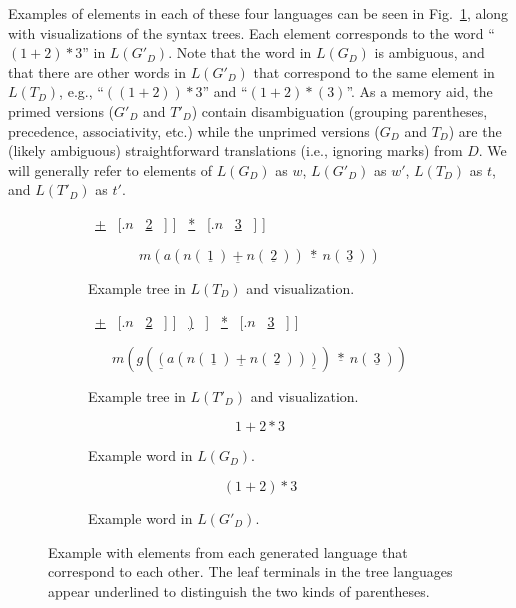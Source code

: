 \documentclass[acmsmall,review,anonymous]{acmart}\settopmatter{printfolios=true,printccs=false,printacmref=false}
\begin{document}
Examples of elements in each of these four languages can be seen in Fig.~\ref{fig:example-words-in-square}, along with visualizations of the syntax trees. Each element corresponds to the word ``$(1 + 2) * 3$'' in $L(G'_D)$. Note that the word in $L(G_D)$ is ambiguous, and that there are other words in $L(G'_D)$ that correspond to the same element in $L(T_D)$, e.g., ``$((1 + 2)) * 3$'' and ``$(1 + 2) * (3)$''. As a memory aid, the primed versions ($G'_D$ and $T'_D$) contain disambiguation (grouping parentheses, precedence, associativity, etc.) while the unprimed versions ($G_D$ and $T_D$) are the (likely ambiguous) straightforward translations (i.e., ignoring marks) from $D$. We will generally refer to elements of $L(G_D)$ as $w$, $L(G'_D)$ as $w'$, $L(T_D)$ as $t$, and $L(T'_D)$ as $t'$.

{
\newcommand{\terminal}[1]{\ \underline{#1}\ }

\begin{figure}
  \begin{subfigure}[b]{.45\linewidth}
    \begin{center}
    \Tree [.{$m$}
        [.{$a$}
          [.{$n$} \terminal{1} ]
          \terminal{+}
          [.{$n$} \terminal{2} ] ]
        \terminal{*}
        [.{$n$} \terminal{3} ] ]
    \end{center}
    \[m(a(n(\terminal{1}) \terminal{+} n(\terminal{2})) \terminal{*} n(\terminal{3}))\]
    \caption{Example tree in $L(T_D)$ and visualization.}
  \end{subfigure}
  \begin{subfigure}[b]{.45\linewidth}
    \begin{center}
    \Tree [.{$m$}
        [.{$g$}
          \terminal{(}
          [.{$a$}
            [.{$n$} \terminal{1} ]
            \terminal{+}
            [.{$n$} \terminal{2} ] ]
          \terminal{)} ]
        \terminal{*}
        [.{$n$} \terminal{3} ] ]
    \end{center}
    \[m(g( \terminal{(} a(n( \terminal{1} ) \terminal{+} n( \terminal{2} )) \terminal{)} ) \terminal{*} n( \terminal{3} ))\]
    \caption{Example tree in $L(T'_D)$ and visualization.}
  \end{subfigure}

  \begin{subfigure}[b]{.40\linewidth}
    \[1 + 2 * 3\]
    \caption{Example word in $L(G_D)$.}
  \end{subfigure}
  \begin{subfigure}[b]{.40\linewidth}
    \[(1 + 2) * 3\]
    \caption{Example word in $L(G'_D)$.}
  \end{subfigure}
  \caption{Example with elements from each generated language that correspond to each other. The leaf terminals in the tree languages appear underlined to distinguish the two kinds of parentheses.}
  \label{fig:example-words-in-square}
\end{figure}
}
\end{document}

